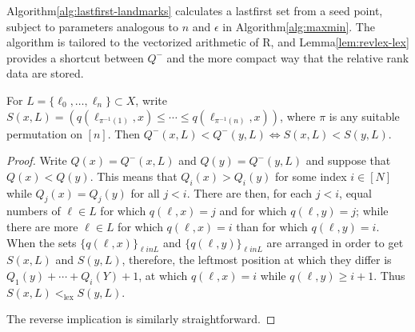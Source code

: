 \documentclass[
]{article}
\begin{document}
Algorithm\nbs\ref{alg:lastfirst-landmarks} calculates a lastfirst set
from a seed point, subject to parameters analogous to \(n\) and
\(\epsilon\) in Algorithm\nbs\ref{alg:maxmin}. The algorithm is tailored
to the vectorized arithmetic of R, and Lemma\nbs\ref{lem:revlex-lex}
provides a shortcut between \(Q^-\) and the more compact way that the
relative rank data are stored.

\begin{lemma}\label{lem:revlex-lex}
For $L = \{ \ell_0, \ldots, \ell_n \} \subset X$, write $S(x,L) = ( q(\ell_{\pi^{-1}(1)},x) \leq \cdots \leq q(\ell_{\pi^{-1}(n)},x) )$, where $\pi$ is any suitable permutation on $[n]$.
Then $Q^-(x,L) < Q^-(y,L) \Leftrightarrow S(x,L) < S(y,L)$.
\end{lemma}

\begin{proof}
Write $Q(x) = Q^-(x,L)$ and $Q(y) = Q^-(y,L)$ and suppose that $Q(x) < Q(y)$.
This means that $Q_i(x) > Q_i(y)$ for some index $i \in [N]$ while $Q_j(x) = Q_j(y)$ for all $j < i$.
There are then, for each $j < i$, equal numbers of $\ell \in L$ for which $q(\ell,x) = j$ and for which $q(\ell,y) = j$; while there are more $\ell \in L$ for which $q(\ell,x) = i$ than for which $q(\ell,y) = i$.
When the sets $\{ q(\ell,x) \}_{\ell in L}$ and $\{ q(\ell,y) \}_{\ell in L}$ are arranged in order to get $S(x,L)$ and $S(y,L)$, therefore, the leftmost position at which they differ is $Q_1(y) + \cdots + Q_i(Y) + 1$, at which $q(\ell,x) = i$ while $q(\ell,y) \geq i + 1$.
Thus $S(x,L) <_{\operatorname{lex}} S(y,L)$.

The reverse implication is similarly straightforward.
\end{proof}
\end{document}
